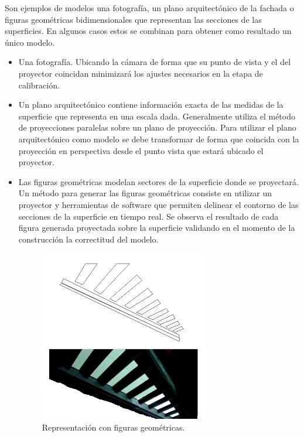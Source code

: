 Son ejemplos de modelos una fotografía, un plano arquitectónico de la fachada o figuras geométricas bidimensionales que representan las secciones de las superficies. En algunos casos estos se combinan para obtener como resultado un único modelo.
\begin{itemize}
  \item Una fotografía. Ubicando la cámara de forma que su punto de vista y el del proyector coincidan minimizará los ajustes necesarios en la etapa de calibración.
  \item Un plano arquitectónico contiene información exacta de las medidas de la superficie que representa en una escala dada. Generalmente utiliza el método de proyecciones paralelas \cite{LibroCompGrafica} sobre un plano de proyección. Para utilizar el plano arquitectónico como modelo se debe transformar de forma que coincida con la proyección en perspectiva desde el punto vista que estará ubicado el proyector.
  \item Las figuras geométricas modelan sectores de la superficie donde se proyectará. Un método para generar las figuras geométricas consiste en utilizar un proyector y herramientas de software que permiten delinear el contorno de las secciones de la superficie en tiempo real. Se observa el resultado de cada figura generada proyectada sobre la superficie validando en el momento de la construcción la correctitud del modelo.%
\begin{figure}[H]
  \centering
    \includegraphics[width=0.7\textwidth]{./Cap2_videomapping/RepresentacionconfigurasGeometricas}
  \caption{Representación con figuras geométricas.}
  \label{fig:RepresentacionconfigurasGeometricas}
\end{figure}


\end{itemize}
